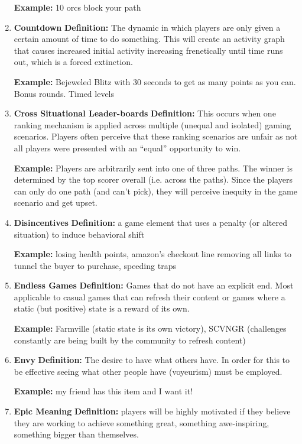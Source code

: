 \begin{enumerate}
\textbf{Example:} 10 orcs block your path

\item \textbf{Countdown}
\textbf{Definition:} The dynamic in which players are only given a certain amount of time to do something. This will create an activity graph that causes increased initial activity increasing frenetically until time runs out, which is a forced extinction.

\textbf{Example:} Bejeweled Blitz with 30 seconds to get as many points as you can. Bonus rounds. Timed levels

\item \textbf{Cross Situational Leader-boards}
\textbf{Definition:} This occurs when one ranking mechanism is applied across multiple (unequal and isolated) gaming scenarios. Players often perceive that these ranking scenarios are unfair as not all players were presented with an “equal” opportunity to win.

\textbf{Example:} Players are arbitrarily sent into one of three paths. The winner is determined by the top scorer overall (i.e. across the paths). Since the players can only do one path (and can't pick), they will perceive inequity in the game scenario and get upset.

\item \textbf{Disincentives}
\textbf{Definition: }a game element that uses a penalty (or altered situation) to induce behavioral shift

\textbf{Example:} losing health points, amazon’s checkout line removing all links to tunnel the buyer to purchase, speeding traps

\item \textbf{Endless Games}
\textbf{Definition:} Games that do not have an explicit end. Most applicable to casual games that can refresh their content or games where a static (but positive) state is a reward of its own.

\textbf{Example:} Farmville (static state is its own victory), SCVNGR (challenges constantly are being built by the community to refresh content)

\item \textbf{Envy}
\textbf{Definition:} The desire to have what others have. In order for this to be effective seeing what other people have (voyeurism) must be employed.

\textbf{Example:} my friend has this item and I want it!

\item \textbf{Epic Meaning}
\textbf{Definition:} players will be highly motivated if they believe they are working to achieve something great, something awe-inspiring, something bigger than themselves.


\end{enumerate}

